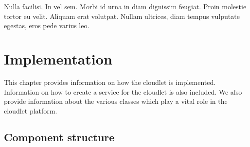 \begin{savequote}[75mm] 
Nulla facilisi. In vel sem. Morbi id urna in diam dignissim feugiat. Proin molestie tortor eu velit. Aliquam erat volutpat. Nullam ultrices, diam tempus vulputate egestas, eros pede varius leo.
\end{savequote}

\chapter{Implementation}
\label{chapterfour}

This chapter provides information on how the cloudlet is implemented. Information on how to create a service for the cloudlet is also included. We also provide information about the various classes which play a vital role in the cloudlet platform.

\section{Component structure}
\label{sect:structure}

